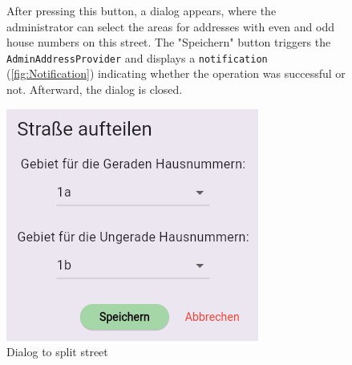 \begin{figure}[H] 
    \begin{minipage}{0.6\textwidth}
        After pressing this button, a dialog appears, where the administrator can select the areas for addresses with even and odd house numbers on this street. The "Speichern" button triggers the \texttt{AdminAddressProvider} and displays a \texttt{notification} (\ref{fig:Notification}) indicating whether the operation was successful or not. Afterward, the dialog is closed.
    \end{minipage}
    \hfill
    \begin{minipage}{0.35\textwidth}
        \centering
        \includegraphics[width=\linewidth]{images/AdminPanel/splitStreetDialog.png}
        \caption{Dialog to split street}
    \end{minipage}
\end{figure}



